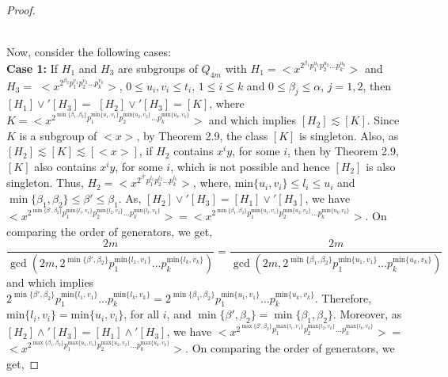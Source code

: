 \documentclass{article}
\theoremstyle{definition}
\begin{document}
\begin{proof}
\begin{figure}[h]
\begin{tikzpicture}[scale=1.5,  every node/.style={circle, fill=black, minimum size=6pt, inner sep=0pt}]
		\end{tikzpicture}
        \caption{}
\end{figure}\\
Now, consider the following cases:\vspace{0.2cm} \\
\textbf{Case 1:} If $H_1$ and $H_3$ are subgroups of $Q_{4m}$ with $H_1=\bigl<x^{2^{\beta_1}p_1^{u_1}p_2^{u_2}\dots p_k^{u_k}}\bigr>$ and $H_3=$ $\bigl<x^{2^{\beta_2}{p_1^{v_1}p_2^{v_2}\dots p_k^{v_k}}}\bigr>$, $0\le u_i,v_i\le t_i$, $1\le i\le k$ and $0\le\beta_j \le \alpha$, $j=1,2$, then $[H_1]\vee' [H_3]=$    $[H_2]\vee' [H_3]=[K]$, where $K=\bigl<x^{2^{\min\{\beta_1,\beta_2\}}p_1^{\text{min}\{u_1,v_1\}}p_2^{\text{min}\{u_2,v_2\}}\dots p_k^{\text{min}\{u_k,v_k\}}}\bigr>$ and which implies $[H_2]\lesssim [K]$. Since $K$ is a subgroup of $\bigl<x\bigr>$, by Theorem 2.9, the class $[K]$ is singleton. Also, as $[H_2]\lesssim [K]\lesssim [\bigl<x\bigr>]$, if $H_2$ contains $x^iy$, for some $i$, then by Theorem 2.9, $[K]$ also contains $x^iy$, for some $i$, which is not possible and hence $[H_2]$ is also singleton. Thus, $H_2=\bigl<x^{2^{\beta'}{ p_1^{l_1}p_2^{l_2}\dots p_k^{l_k}}}\bigr>$, where, $\text{min}\{u_i,v_i\}\le l_i\le u_i$ and $\min\{\beta_1,\beta_2\}\le \beta'\le \beta_1$. As, $[H_2]\vee' [H_3]=[H_1]\vee' [H_3]$, we have $\bigl<x^{2^{\min\{\beta',\beta_2\}}p_1^{\text{min}\{l_1,v_1\}}p_2^{\text{min}\{l_2,v_2\}}\dots p_k^{\text{min}\{l_k,v_k\}}}\bigr>=\bigl<x^{2^{\min{\{\beta_1,\beta_2\}}}p_1^{\text{min}\{u_1,v_1\}}p_2^{\text{min}\{u_2,v_2\}}\dots p_k^{\text{min}\{u_k,v_k\}}}\bigr>$. On comparing the order of generators, we get,
\begin{equation*}
\frac{2m}{\gcd(2m, 2^{\min\{\beta',\beta_2\}}p_1^{\text{min}\{l_1,v_1\}}\dots p_k^{\text{min}\{l_k,v_k\}}   )}=\frac{2m}{\gcd(2m, 2^{\min\{\beta_1,\beta_2\}}p_1^{\text{min}\{u_1,v_1\}}\dots p_k^{\text{min}\{u_k,v_k\}})}
\end{equation*}
and which implies $2^{\min\{\beta',\beta_2\}}p_1^{\text{min}\{l_1,v_1\}}\dots p_k^{\text{min}\{l_k,v_k\}}=2^{\min\{\beta_1,\beta_2\}}p_1^{\text{min}\{u_1,v_1\}}\dots p_k^{\text{min}\{u_k,v_k\}}$. Therefore, $\text{min}\{l_i,v_i\}=\text{min}\{u_i,v_i\}$, for all $i$, and $\min\{\beta',\beta_2\}=\min\{\beta_1,\beta_2\}$.
Moreover, as $[H_2]\wedge' [H_3]=[H_1]\wedge'[H_3]$, we have $\bigl<x^{2^{\max\{\beta',\beta_2\}}p_1^{\text{max}\{l_1,v_1\}}p_2^{\text{max}\{l_2,v_2\}}\dots p_k^{\text{max}\{l_k,v_k\}}}\bigr>=  $ $ \bigl<x^{2^{\max\{\beta_1,\beta_2\}}p_1^{\text{max}\{u_1,v_1\}}p_2^{\text{max}\{u_2,v_2\}}\dots p_k^{\text{max}\{u_k,v_k\}}}\bigr>$. On comparing the order of generators, we get,

\end{proof}
\end{document}
